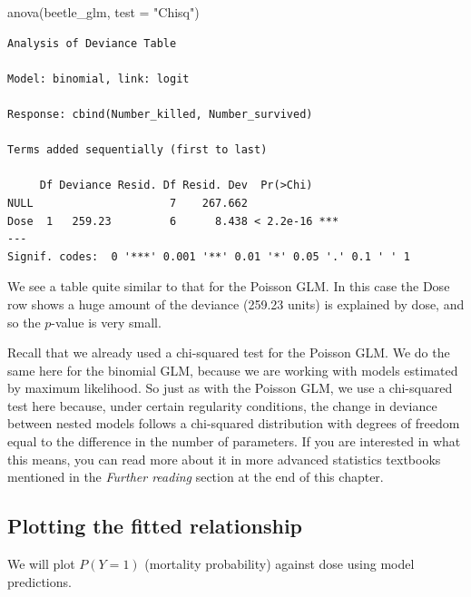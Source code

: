 \documentclass[
  letterpaper,
  8pt,
  a4paper]{book}
\newenvironment{Shaded}{\begin{snugshade}}{\end{snugshade}}
\newcommand{\AttributeTok}[1]{\textcolor[rgb]{0.40,0.45,0.13}{#1}}
\newcommand{\FunctionTok}[1]{\textcolor[rgb]{0.28,0.35,0.67}{#1}}
\newcommand{\NormalTok}[1]{\textcolor[rgb]{0.00,0.23,0.31}{#1}}
\newcommand{\StringTok}[1]{\textcolor[rgb]{0.13,0.47,0.30}{#1}}
\begin{document}
\begin{Shaded}
\begin{Highlighting}[]
\FunctionTok{anova}\NormalTok{(beetle\_glm, }\AttributeTok{test =} \StringTok{"Chisq"}\NormalTok{)}
\end{Highlighting}
\end{Shaded}

\begin{verbatim}
Analysis of Deviance Table

Model: binomial, link: logit

Response: cbind(Number_killed, Number_survived)

Terms added sequentially (first to last)

     Df Deviance Resid. Df Resid. Dev  Pr(>Chi)    
NULL                     7    267.662              
Dose  1   259.23         6      8.438 < 2.2e-16 ***
---
Signif. codes:  0 '***' 0.001 '**' 0.01 '*' 0.05 '.' 0.1 ' ' 1
\end{verbatim}

We see a table quite similar to that for the Poisson GLM. In this case
the Dose row shows a huge amount of the deviance (259.23 units) is
explained by dose, and so the \(p\)-value is very small.

Recall that we already used a chi-squared test for the Poisson GLM. We
do the same here for the binomial GLM, because we are working with
models estimated by maximum likelihood. So just as with the Poisson GLM,
we use a chi-squared test here because, under certain regularity
conditions, the change in deviance between nested models follows a
chi-squared distribution with degrees of freedom equal to the difference
in the number of parameters. If you are interested in what this means,
you can read more about it in more advanced statistics textbooks
mentioned in the \emph{Further reading} section at the end of this
chapter.

\subsection*{Plotting the fitted
relationship}\label{plotting-the-fitted-relationship}

We will plot \(P(Y=1)\) (mortality probability) against dose using model
predictions.
\end{document}
